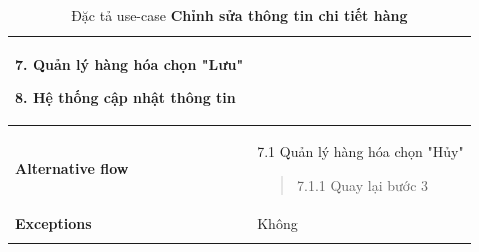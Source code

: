 {\begin{longtable}{| p{} | p{} |}
                    7. Quản lý hàng hóa chọn "Lưu"
                    
                    8. Hệ thống cập nhật thông tin
                \\
                \hline
                \begin{flushleft}
                    \textbf{Alternative flow}
                \end{flushleft}
                &
                7.1 Quản lý hàng hóa chọn "Hủy"
                    \begin{quote} 
                    7.1.1 Quay lại bước 3
                    \end{quote}
                \\
                \hline
                    \textbf{Exceptions} 
                &
                    Không
                \\
                \hline
                \caption{Đặc tả use-case \textbf{Chỉnh sửa thông tin chi tiết hàng}}
            
            \end{longtable}
        }

